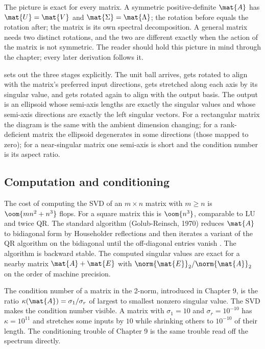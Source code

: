 The picture is exact for every matrix. A symmetric positive-definite
$\mat{A}$ has $\mat{U} = \mat{V}$ and $\mat{\Sigma} = \mat{\Lambda}$;
the rotation before equals the rotation after; the matrix is its own
spectral decomposition. A general matrix needs two distinct
rotations, and the two are different exactly when the action of the
matrix is not symmetric. The reader should hold this picture in mind
through the chapter; every later derivation follows it.



 sets out the three stages
explicitly. The unit ball arrives, gets rotated to align with the
matrix's preferred input directions, gets stretched along each axis
by its singular value, and gets rotated again to align with the
output basis. The output is an ellipsoid whose semi-axis lengths are
exactly the singular values and whose semi-axis directions are
exactly the left singular vectors. For a rectangular matrix the
diagram is the same with the ambient dimension changing; for a
rank-deficient matrix the ellipsoid degenerates in some directions
(those mapped to zero); for a near-singular matrix one semi-axis is
short and the condition number is its aspect ratio.

\subsection{Computation and conditioning}

The cost of computing the SVD of an $m \times n$ matrix with $m \geq
n$ is $\oom{mn^{2} + n^{3}}$ flops. For a square matrix this is
$\oom{n^{3}}$, comparable to LU and twice QR. The standard algorithm
(Golub-Reinsch, 1970) reduces $\mat{A}$ to bidiagonal form by
Householder reflections and then iterates a variant of the QR
algorithm on the bidiagonal until the off-diagonal entries vanish
\cite[ch.~31]{text:trefethen-bau1997}. The algorithm is backward
stable. The computed singular values are exact for a nearby matrix
$\mat{A} + \mat{E}$ with $\norm{\mat{E}}_{2}/\norm{\mat{A}}_{2}$ on
the order of machine precision.

The condition number of a matrix in the 2-norm, introduced in
Chapter 9, is the ratio $\kappa(\mat{A}) = \sigma_{1}/\sigma_{r}$
of largest to smallest nonzero singular value. The SVD makes the
condition number visible. A matrix with $\sigma_{1} = 10$ and
$\sigma_{r} = 10^{-10}$ has $\kappa = 10^{11}$ and stretches some
inputs by $10$ while shrinking others to $10^{-10}$ of their length.
The conditioning trouble of Chapter 9 is the same trouble read
off the spectrum directly.

